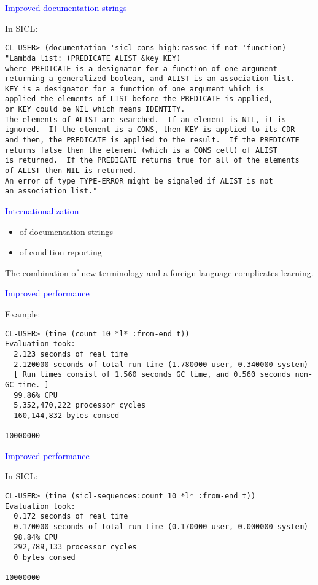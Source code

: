 \documentclass{slides}
\newcommand{\ti}[1]{\begin{center}\Large{\textcolor{blue}{#1}}\end{center}}
\begin{document}
\begin{slide}\ti{Improved documentation strings}
In SICL:
\small
\begin{verbatim}
CL-USER> (documentation 'sicl-cons-high:rassoc-if-not 'function)
"Lambda list: (PREDICATE ALIST &key KEY)
where PREDICATE is a designator for a function of one argument
returning a generalized boolean, and ALIST is an association list.
KEY is a designator for a function of one argument which is
applied the elements of LIST before the PREDICATE is applied,
or KEY could be NIL which means IDENTITY.
The elements of ALIST are searched.  If an element is NIL, it is
ignored.  If the element is a CONS, then KEY is applied to its CDR
and then, the PREDICATE is applied to the result.  If the PREDICATE
returns false then the element (which is a CONS cell) of ALIST
is returned.  If the PREDICATE returns true for all of the elements
of ALIST then NIL is returned.
An error of type TYPE-ERROR might be signaled if ALIST is not
an association list."
\end{verbatim}
\vfill\end{slide}
\begin{slide}\ti{Internationalization}
\begin{itemize}
\item of documentation strings
\item of condition reporting
\end{itemize}

The combination of new terminology and a foreign language complicates
learning. 
\vfill\end{slide}
\begin{slide}\ti{Improved performance}
Example:
\small
\begin{verbatim}
CL-USER> (time (count 10 *l* :from-end t))
Evaluation took:
  2.123 seconds of real time
  2.120000 seconds of total run time (1.780000 user, 0.340000 system)
  [ Run times consist of 1.560 seconds GC time, and 0.560 seconds non-GC time. ]
  99.86% CPU
  5,352,470,222 processor cycles
  160,144,832 bytes consed
  
10000000
\end{verbatim}
\vfill\end{slide}
\begin{slide}\ti{Improved performance}
In SICL:
\small
\begin{verbatim}
CL-USER> (time (sicl-sequences:count 10 *l* :from-end t))
Evaluation took:
  0.172 seconds of real time
  0.170000 seconds of total run time (0.170000 user, 0.000000 system)
  98.84% CPU
  292,789,133 processor cycles
  0 bytes consed
  
10000000
\end{verbatim}
\vfill\end{slide}
\end{document}
